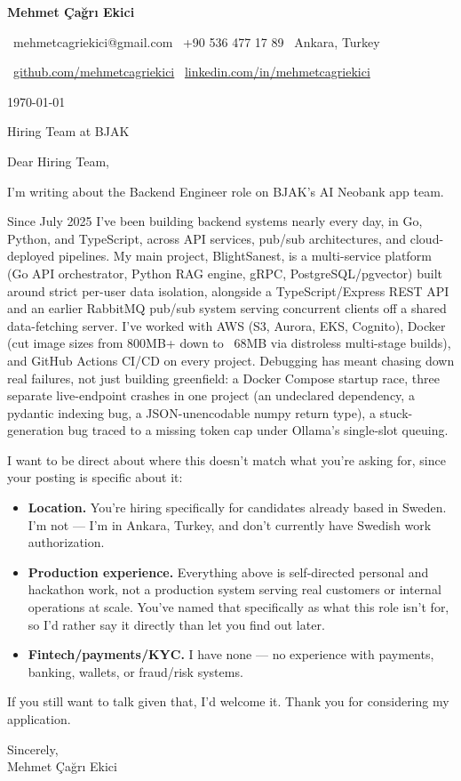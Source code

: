 \documentclass[11pt,a4paper]{article}
\begin{document}
{\Huge\bfseries\color{accent} Mehmet Çağrı Ekici}

\vspace{4pt}
\faEnvelope\ mehmetcagriekici@gmail.com \quad
\faPhone\ +90 536 477 17 89 \quad
\faMapMarker\ Ankara, Turkey

\faGithub\ \href{https://github.com/mehmetcagriekici}{github.com/mehmetcagriekici} \quad
\faLinkedin\ \href{https://linkedin.com/in/mehmetcagriekici}{linkedin.com/in/mehmetcagriekici}

\vspace{12pt}

\today

\vspace{12pt}

Hiring Team at BJAK

\vspace{12pt}

Dear Hiring Team,

I'm writing about the Backend Engineer role on BJAK's AI Neobank app team.

Since July 2025 I've been building backend systems nearly every day, in Go, Python, and TypeScript, across API services, pub/sub architectures, and cloud-deployed pipelines. My main project, BlightSanest, is a multi-service platform (Go API orchestrator, Python RAG engine, gRPC, PostgreSQL/pgvector) built around strict per-user data isolation, alongside a TypeScript/Express REST API and an earlier RabbitMQ pub/sub system serving concurrent clients off a shared data-fetching server. I've worked with AWS (S3, Aurora, EKS, Cognito), Docker (cut image sizes from 800MB+ down to ~68MB via distroless multi-stage builds), and GitHub Actions CI/CD on every project. Debugging has meant chasing down real failures, not just building greenfield: a Docker Compose startup race, three separate live-endpoint crashes in one project (an undeclared dependency, a pydantic indexing bug, a JSON-unencodable numpy return type), a stuck-generation bug traced to a missing token cap under Ollama's single-slot queuing.

I want to be direct about where this doesn't match what you're asking for, since your posting is specific about it:

\begin{itemize}
\item \textbf{Location.} You're hiring specifically for candidates already based in Sweden. I'm not — I'm in Ankara, Turkey, and don't currently have Swedish work authorization.
\item \textbf{Production experience.} Everything above is self-directed personal and hackathon work, not a production system serving real customers or internal operations at scale. You've named that specifically as what this role isn't for, so I'd rather say it directly than let you find out later.
\item \textbf{Fintech/payments/KYC.} I have none — no experience with payments, banking, wallets, or fraud/risk systems.
\end{itemize}

If you still want to talk given that, I'd welcome it. Thank you for considering my application.

\vspace{12pt}

Sincerely,\\
Mehmet Çağrı Ekici
\end{document}
